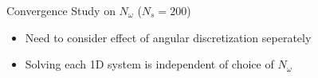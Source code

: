 \documentclass{beamer}
\begin{document}
\begin{frame}{Convergence Study on $N_\omega$ \quad ($N_s = 200$)}
	\centering
	\begin{itemize}
		\item Need to consider effect of angular discretization seperately
		\item Solving each 1D system is independent of choice of $N_\omega$
	\end{itemize}  
	\centering
\end{frame}
\end{document}
